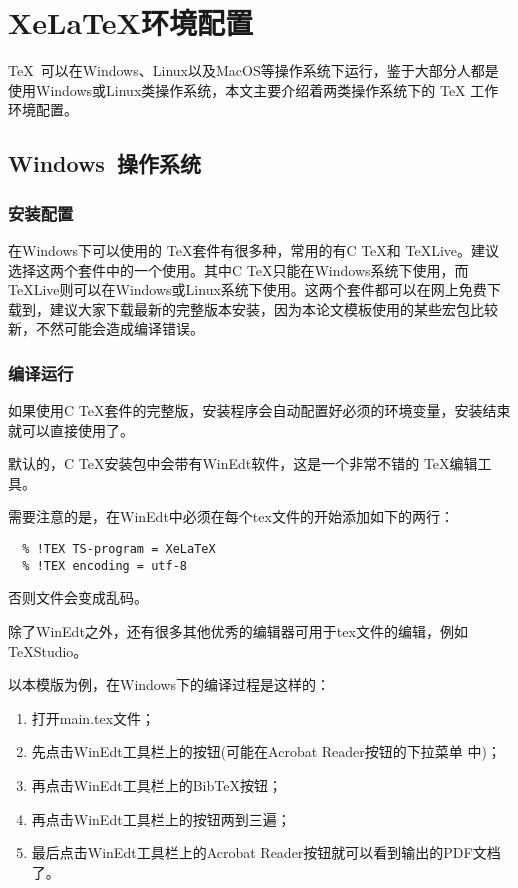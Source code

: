 
%
%
%

\chapter{XeLaTeX环境配置}
\label{chap02}

\TeX{}~可以在Windows、Linux以及MacOS等操作系统下运行，鉴于大部分人都是使用Windows或Linux类操作系统，本文主要介绍着两类操作系统下的 \TeX{} 工作环境配置。

\section{Windows~操作系统}

\subsection{安装配置}
在Windows下可以使用的 \TeX{}套件有很多种，常用的有C \TeX{}和 \TeX{}Live。建议选择这两个套件中的一个使用。其中C \TeX{}只能在Windows系统下使用，而 \TeX{}Live则可以在Windows或Linux系统下使用。这两个套件都可以在网上免费下载到，建议大家下载最新的完整版本安装，因为本论文模板使用的某些宏包比较新，不然可能会造成编译错误。

\subsection{编译运行}
如果使用C \TeX{}套件的完整版，安装程序会自动配置好必须的环境变量，安装结束就可以直接使用了。

默认的，C \TeX{}安装包中会带有WinEdt软件，这是一个非常不错的 \TeX{}编辑工具。

需要注意的是，在WinEdt中必须在每个tex文件的开始添加如下的两行：
\begin{lstlisting}
  % !TEX TS-program = XeLaTeX
  % !TEX encoding = utf-8
\end{lstlisting}
否则文件会变成乱码。

除了WinEdt之外，还有很多其他优秀的编辑器可用于tex文件的编辑，例如TeXStudio。

以本模版为例，在Windows下的编译过程是这样的：
\begin{enumerate}
\item 打开main.tex文件；
\item 先点击WinEdt工具栏上的\XeLaTeX{}按钮(可能在Acrobat Reader按钮的下拉菜单
  中)；
\item 再点击WinEdt工具栏上的Bib\TeX{}按钮；
\item 再点击WinEdt工具栏上的\XeLaTeX{}按钮两到三遍；
\item 最后点击WinEdt工具栏上的Acrobat Reader按钮就可以看到输出的PDF文档了。
\end{enumerate}

